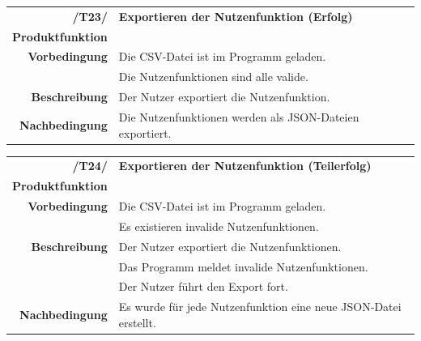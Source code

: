\documentclass{article}
\begin{document}
\begin{table}[H]
\begin{tabularx}{\textwidth}{rX}
\vspace{1mm}
\textbf{/T23/}         & \textbf{Exportieren der Nutzenfunktion (Erfolg)} \\ \vspace{1mm}
\textbf{Produktfunktion} & \nameref{sec:f:Alternativen exportieren} \\
\textbf{Vorbedingung}  & Die CSV-Datei ist im Programm geladen. \\  \vspace{1mm}& Die Nutzenfunktionen sind alle valide. \\
\textbf{Beschreibung}  & Der Nutzer exportiert die Nutzenfunktion. \\
\textbf{Nachbedingung} & Die Nutzenfunktionen werden als JSON-Dateien exportiert.
\end{tabularx}
\end{table}

\begin{table}[H]
\begin{tabularx}{\textwidth}{rX}
\vspace{1mm}
\textbf{/T24/}         & \textbf{Exportieren der Nutzenfunktion (Teilerfolg)} \\ \vspace{1mm}
\textbf{Produktfunktion} & \nameref{sec:f:Alternativen exportieren} \\
\textbf{Vorbedingung}  & Die CSV-Datei ist im Programm geladen. \\  \vspace{1mm}& Es existieren invalide Nutzenfunktionen. \\
\textbf{Beschreibung}  & Der Nutzer exportiert die Nutzenfunktionen. \\ & Das Programm meldet invalide Nutzenfunktionen. \\ \vspace{1mm} & Der Nutzer führt den Export fort. \\
\textbf{Nachbedingung} & Es wurde für jede Nutzenfunktion eine neue JSON-Datei erstellt.
\end{tabularx}
\end{table}
\end{document}
